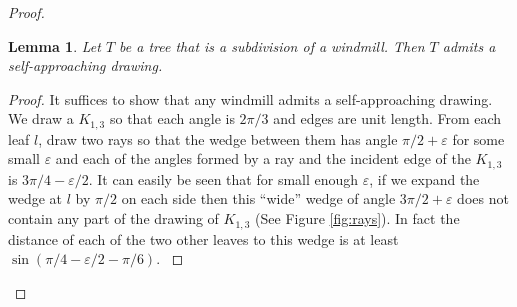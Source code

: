 \documentclass[11pt]{article}
\newtheorem{lemma}[theorem]{Lemma}
\newcommand{\ignore}[1]{}
\newcommand{\changeAL}[1]{{#1}}
\newcommand{\changeS}[1]{{#1}}
\begin{document}
\begin{proof}
\begin{lemma}
\label{secondlemma}
Let $T$ be a tree that is a subdivision of a windmill.  Then $T$ admits a self-approaching drawing.
\end{lemma}
\begin{proof}
It suffices to show that any windmill admits a self-approaching drawing. We draw a $K_{1,3}$ so that each angle is $2\pi/3$ and edges are unit length.
\changeAL{From each leaf $l$, draw two rays  so that the  wedge between them has angle
$\pi/2 + \varepsilon$
for some small $\varepsilon$ and each of the angles formed by a ray and the incident edge of the $K_{1,3}$ is
$3\pi/4 - \varepsilon/2$.
It can easily be seen that \changeS{for small enough $\varepsilon$,
if we expand the wedge at $l$ by $\pi/2$ on each side then this ``wide'' wedge of angle $3\pi/2 + \varepsilon$ does not contain any part of the drawing of $K_{1,3}$ (See Figure \ref{fig:rays}).
In fact the distance of each of the two other leaves to this wedge is at least
$\sin(\pi/4-\varepsilon/2-\pi/6)$.
}}


\ignore{
\begin{figure}
\begin{center}
\begin{tikzpicture}
\path (0,0) coordinate (origin);
\path (0:1cm) coordinate (P0);
\path (P0) ++(54:3cm) coordinate (P00);
\path (P0) ++(360-54:3cm) coordinate (P01);
\path (1*120:1cm) coordinate (P1);
\path (P1) ++(120+54:3cm) coordinate (P10);
\path (P1) ++(120-54:3cm) coordinate (P11);
\path (P1) ++(120-54:0.1cm) coordinate (P1close0);
\path (P1) ++(120-54-90:0.1cm) coordinate (P1close2);
\path (P1close0) ++(120-54-90:0.1cm) coordinate (P1close1);
\path (P1) ++(120-54-90:7cm) coordinate (P1bad0);
\path (2*120:1cm) coordinate (P2);
\path (P2) ++(240+54:3cm) coordinate (P20);
\path (P2) ++(240-54:3cm) coordinate (P21);
\path (P2) ++(240+54:0.1cm) coordinate (P2close0);
\path (P2) ++(240+54+90:0.1cm) coordinate (P2close2);
\path (P2close0) ++(240+54+90:0.1cm) coordinate (P2close1);
\path (P2) ++(240+54+90:7cm) coordinate (P2bad0);
\draw (origin) -- (P0) (origin) -- (P1) (origin) -- (P2);
\draw [dashed] (P0) -- (P00) (P0) -- (P01) (P1) -- (P10) (P1) -- (P11) (P2) -- (P20) (P2) -- (P21);
\draw [dotted] (P1) -- (P1bad0) (P2) -- (P2bad0);
\draw [red] (P1close0) -- (P1close1) -- (P1close2);
\draw [red] (P2close0) -- (P2close1) -- (P2close2);
\draw [fill=red] (origin) circle (0.04cm);
\node [above right] at (origin) {$s$};
\draw [fill=red] (P0) circle (0.04cm);
\node [above left] at (P0) {$l_0$};
\draw [fill=red] (P1) circle (0.04cm);
\node [below left] at (P1) {$l_1$};
\draw [fill=red] (P2) circle (0.04cm);
\node [above left] at (P2) {$l_2$};
\end{tikzpicture}
\caption{The drawing of $s$ and its three neighbors (solid lines) along with the two rays of the neighbors (dashed).The constructed drawing should be such that the sweep attached to $l_0$ lies completely inside the area next to $l_0$ that is bounded by dashed and dotted lines.}
\label{fig:rays}
\end{center}
\end{figure}
}


\end{proof}
\end{proof}
\end{document}
